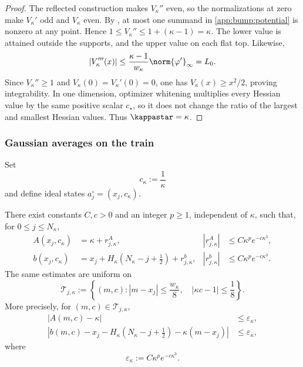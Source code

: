 \begin{proof}
The reflected construction makes \(V_\kappa''\) even, so the
normalizations at zero make \(V_\kappa'\) odd and \(V_\kappa\) even.
By , at most one summand in
\eqref{app:bump:potential} is nonzero at any point.  Hence
\(1\leq V_\kappa''\leq1+(\kappa-1)=\kappa\).  The lower value is
attained outside the supports, and the upper value on each flat top.
Likewise,
\[
    |V_\kappa'''(x)|
    \leq\frac{\kappa-1}{w_\kappa}\norm{\varphi'}_\infty=L_0.
\]
Since \(V_\kappa''\geq1\) and
\(V_\kappa(0)=V_\kappa'(0)=0\), one has
\(V_\kappa(x)\geq x^2/2\), proving integrability.  In one dimension,
optimizer whitening multiplies every Hessian value by the same positive
scalar \(c_\star\), so it does not change the ratio of the largest and
smallest Hessian values.  Thus \(\kappastar=\kappa\).
\end{proof}

\subsubsection{Gaussian averages on the train}

Set
\begin{equation}
\label{app:bump:matched-covariance}
    c_\kappa:=\frac1\kappa
\end{equation}
and define ideal states \(a_j^\circ=(x_j,c_\kappa)\).

\begin{lemma}
\label{app:bump:averages}
There exist constants \(C,c>0\) and an integer \(p\geq1\), independent
of \(\kappa\), such that, for \(0\leq j\leq N_\kappa\),
\begin{align}
\label{app:bump:center-curvature}
    A(x_j,c_\kappa)
    &=\kappa+r^A_{j,\kappa},
    &
    |r^A_{j,\kappa}|
    &\leq C\kappa^p e^{-c\kappa^3},\\
\label{app:bump:center-score}
    b(x_j,c_\kappa)
    &=x_j+H_\kappa\left(N_\kappa-j+\frac12\right)
      +r^b_{j,\kappa},
    &
    |r^b_{j,\kappa}|
    &\leq C\kappa^p e^{-c\kappa^3}.
\end{align}
The same estimates are uniform on
\begin{equation}
\label{app:bump:tube}
    \mathcal T_{j,\kappa}
    :=\left\{
        (m,c):
        |m-x_j|\leq\frac{w_\kappa}{8},
        \quad
        |\kappa c-1|\leq\frac18
    \right\}.
\end{equation}
More precisely, for \((m,c)\in\mathcal T_{j,\kappa}\),
\begin{align}
\label{app:bump:tube-curvature}
    |A(m,c)-\kappa|
    &\leq\varepsilon_\kappa,\\
\label{app:bump:tube-score}
    \left|
        b(m,c)-x_j
        -H_\kappa\left(N_\kappa-j+\frac12\right)
        -\kappa(m-x_j)
    \right|
    &\leq\varepsilon_\kappa,
\end{align}
where
\begin{equation}
\label{app:bump:epsilon}
    \varepsilon_\kappa:=C\kappa^p e^{-c\kappa^3}.
\end{equation}
\end{lemma}

